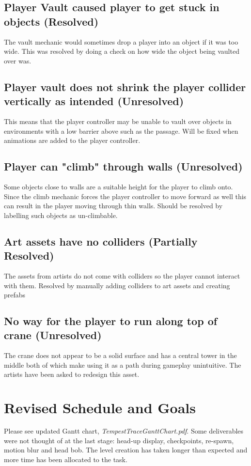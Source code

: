 \documentclass[a4paper,10pt]{article}
\begin{document}
\subsection{Player Vault caused player to get stuck in objects (Resolved)}
The vault mechanic would sometimes drop a player into an object if it was too wide. This was resolved by doing a check on how wide the object being vaulted over was.

\subsection{Player vault does not shrink the player collider vertically as intended (Unresolved)}
This means that the player controller may be unable to vault over objects in environments with a low barrier above such as the passage. Will be fixed when animations are added to the player controller.

\subsection{Player can "climb" through walls (Unresolved)}
Some objects close to walls are a suitable height for the player to climb onto. Since the climb mechanic forces the player controller to move forward as well this can result in the player moving through thin walls. Should be resolved by labelling such objects as un-climbable.

\subsection{Art assets have no colliders (Partially Resolved)}
The assets from artists do not come with colliders so the player cannot interact with them. Resolved by manually adding colliders to art assets and creating prefabs

\subsection{No way for the player to run along top of crane (Unresolved)}
The crane does not appear to be a solid surface and has a central tower in the middle both of which make using it as a path during gameplay unintuitive. The artists have been asked to redesign this asset.

\section{Revised Schedule and Goals}
Please see updated Gantt chart, \textit{TempestTraceGanttChart.pdf}. Some deliverables were not thought of at the last stage: head-up display, checkpoints, re-spawn, motion blur and head bob. The level creation has taken longer than expected and more time has been allocated to the task.
\end{document}

